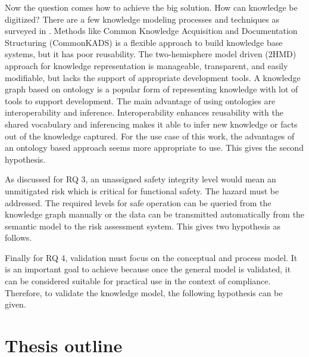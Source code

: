 Now the question comes how to achieve the big solution. How can knowledge be digitized? There are a few knowledge modeling processes and techniques as surveyed in \cite{Yun2021}. Methods like Common Knowledge Acquisition and Documentation Structuring (CommonKADS) is a flexible approach to build knowledge base systems, but it has poor reusability. The two‐hemisphere model driven (2HMD) approach for knowledge representation is manageable, transparent, and easily modifiable, but lacks the support of appropriate development tools. A knowledge graph based on ontology is a popular form of representing knowledge with lot of tools to support development. The main advantage of using ontologies are interoperability and inference. Interoperability enhances reusability with the shared vocabulary and inferencing makes it able to infer new knowledge or facts out of the knowledge captured. For the use case of this work, the advantages of an ontology based approach seems more appropriate to use. This gives the second hypothesis.


As discussed for RQ 3, an unassigned safety integrity level would mean an unmitigated risk which is critical for functional safety. The hazard must be addressed. The required levels for safe operation can be queried from the knowledge graph manually or the data can be transmitted automatically from the semantic model to the risk assessment system. This gives two hypothesis as follows.



Finally for RQ 4, validation must focus on the conceptual and process model. It is an important goal to achieve because once the general model is validated, it can be considered suitable for practical use in the context of compliance. Therefore, to validate the knowledge model, the following hypothesis can be given. 


\section{Thesis outline} \label{outline}

